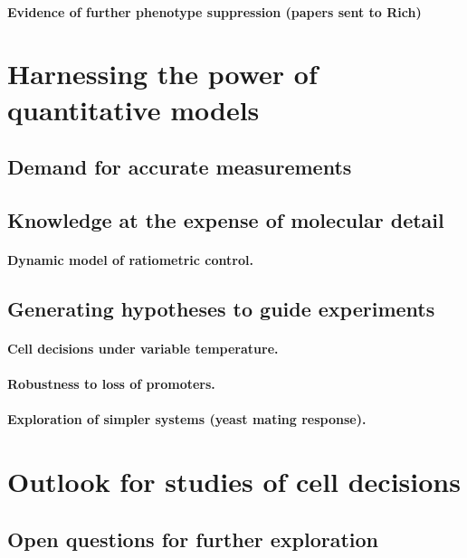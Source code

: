 		\paragraph{Evidence of further phenotype suppression (papers sent to Rich)}

\section{Harnessing the power of quantitative models}

	\subsection{Demand for accurate measurements}
	
	\subsection{Knowledge at the expense of molecular detail}
		\paragraph{Dynamic model of ratiometric control.}		
		
	\subsection{Generating hypotheses to guide experiments}
		\paragraph{Cell decisions under variable temperature.}		
		\paragraph{Robustness to loss of promoters.}
		\paragraph{Exploration of simpler systems (yeast mating response).}
		
\section{Outlook for studies of cell decisions}

	\subsection{Open questions for further exploration}
